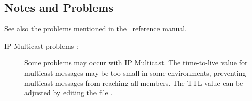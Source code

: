 \subsection{Notes and Problems}

See also the problems mentioned in the \ensemble\ reference manual.
\begin{description}
\item
[IP Multicast problems :] Some problems may occur with IP Multicast.
The time-to-live value for multicast messages may be too small in
some environments, preventing multicast messages from reaching all
members.  The TTL value can be adjusted by editing the file
.
\end{description}
